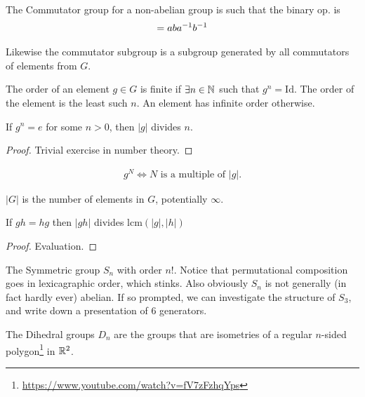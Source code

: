 \documentclass[12pt, twosided]{article}
\begin{document}
  \begin{exa}
    The Commutator group for a non-abelian group is such that the binary op. is
    \begin{align*}
      [a, b] = aba\1b\1
    \end{align*}

    Likewise the commutator subgroup is a subgroup generated by all commutators of elements from \(G\).
  \end{exa}

  \begin{df}
    The order of an element \(g \in G\) is finite if \(\exists n \in \mathbb{N}\) such that \(g^n = \mathrm{Id}\). The order of the element is the least such \(n\). An element has infinite order otherwise.
  \end{df}

  \begin{lm}
    If \(g^n = e\) for some \(n > 0\), then \(|g|\) divides \(n\).
  \end{lm}
  \begin{proof}
    Trivial exercise in number theory.
  \end{proof}

  \begin{cor}
    \begin{align*}
      g^N \Leftrightarrow N \text{ is a multiple of } |g|.
    \end{align*}
  \end{cor}

  \begin{df}
    \(|G|\) is the number of elements in \(G\), potentially \(\infty\).
  \end{df}

  \begin{prop}
    If \(gh = hg\) then \(|gh|\) divides \(\mathrm{lcm}(|g|, |h|)\)
  \end{prop}
  \begin{proof}
    Evaluation.
  \end{proof}

  \begin{exa}
    The Symmetric group \(S_n\) with order \(n!\). Notice that permutational composition goes in lexicagraphic order, which stinks. Also obviously \(S_n\) is not generally (in fact hardly ever) abelian. If so prompted, we can investigate the structure of \(S_3\), and write down a presentation of 6 generators.
  \end{exa}

  \begin{exa}
    The Dihedral groups \(D_n\) are the groups that are isometries of a regular \(n\)-sided polygon\footnote{\url{https://www.youtube.com/watch?v=fV7zFzhqYps}} in \(\mathbb{R}^2\).
  \end{exa}
\end{document}
